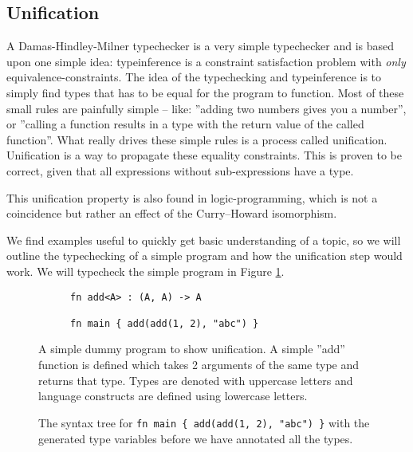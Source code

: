 \subsection{Unification}
A Damas-Hindley-Milner typechecker is a very simple typechecker and is based upon one simple idea: typeinference is a constraint satisfaction problem with \textit{only} equivalence-constraints. The idea of the typechecking and typeinference is to simply find types that has to be equal for the program to function. Most of these small rules are painfully simple -- like: ''adding two numbers gives you a number'', or ''calling a function results in a type with the return value of the called function''. What really drives these simple rules is a process called unification. Unification is a way to propagate these equality constraints. This is proven to be correct, given that all expressions without sub-expressions have a type.

This unification property is also found in logic-programming, which is not a coincidence but rather an effect of the Curry–Howard isomorphism. \cite{src:curryHowardIso}

We find examples useful to quickly get basic understanding of a topic, so we will outline the typechecking of a simple program and how the unification step would work. We will typecheck the simple program in Figure \ref{fig:progUni}.

\begin{figure}
\centering
\begin{subfigure}{.5\textwidth}
  \begin{verbatim}
fn add<A> : (A, A) -> A

fn main { add(add(1, 2), "abc") }
\end{verbatim}
  \end{subfigure}
  \caption{A simple dummy program to show unification. A simple ''add'' function is defined which takes 2 arguments of the same type and returns that type. Types are denoted with uppercase letters and language constructs are defined using lowercase letters.}
  \label{fig:progUni}
\end{figure}

\begin{figure}
\centering
{}
  \cprotect\caption{The syntax tree for \verb|fn main { add(add(1, 2), "abc") }| with the generated type variables before we have annotated all the types.}
  \label{fig:progUniTree}
\end{figure}

